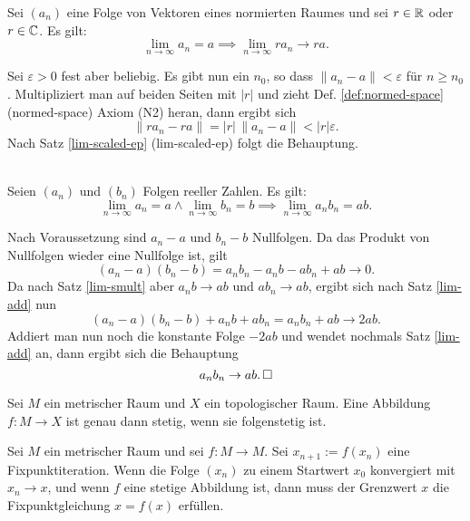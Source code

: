\begin{Satz}\label{lim-smult}
Sei $(a_n)$ eine Folge von Vektoren eines normierten Raumes
und sei $r\in\mathbb R$ oder $r\in\mathbb C$. Es gilt:
\[\lim_{n\to\infty} a_n = a\implies \lim_{n\to\infty} ra_n\to ra.\]
\end{Satz}

\begin{Beweis}
Sei $\varepsilon>0$ fest aber beliebig. Es gibt nun ein $n_0$, so
dass $\|a_n-a\|<\varepsilon$ für $n\ge n_0$.
Multipliziert man auf beiden Seiten
mit $|r|$ und zieht Def. \ref{def:normed-space} (normed-space)
Axiom (N2) heran, dann ergibt sich
\[\|ra_n-ra\| = |r|\,\|a_n-a\|<|r|\varepsilon.\]
Nach Satz \ref{lim-scaled-ep} (lim-scaled-ep)
folgt die Behauptung.\,\qedsymbol
\end{Beweis}

\begin{Satz}\mbox{}\\
Seien $(a_n)$ und $(b_n)$ Folgen
reeller Zahlen. Es gilt:
\[\lim_{n\to\infty} a_n=a\land\lim_{n\to\infty} b_n=b\implies
\lim_{n\to\infty} a_n b_n = ab.\]
\end{Satz}

\begin{Beweis}
Nach Voraussetzung sind $a_n-a$ und $b_n-b$ Nullfolgen.
Da das Produkt von Nullfolgen wieder eine Nullfolge ist, gilt
\[(a_n-a)(b_n-b) = a_n b_n-a_n b-ab_n+ab\to 0.\]
Da nach Satz \ref{lim-smult} aber $a_n b\to ab$ und $ab_n\to ab$,
ergibt sich nach Satz \ref{lim-add} nun
\[(a_n-a)(b_n-b)+a_n b+ab_n = a_n b_n+ab\to 2ab.\]
Addiert man nun noch die konstante Folge $-2ab$
und wendet nochmals Satz \ref{lim-add} an, dann ergibt sich
die Behauptung
\[a_n b_n\to ab.\,\square\]
\end{Beweis}

\newpage
\begin{Satz}\label{cont-seqcont}%
Sei $M$ ein metrischer Raum und $X$ ein topologischer Raum.
Eine Abbildung $f\colon M\to X$ ist genau dann stetig, wenn
sie folgenstetig ist.
\end{Satz}

\begin{Satz}
Sei $M$ ein metrischer Raum und sei $f\colon M\to M$.
Sei $x_{n+1}:=f(x_n)$ eine Fixpunktiteration. Wenn die Folge
$(x_n)$ zu einem Startwert $x_0$ konvergiert mit $x_n\to x$, und
wenn $f$ eine stetige Abbildung ist, dann muss der Grenzwert $x$ die
Fixpunktgleichung $x=f(x)$ erfüllen.
\end{Satz}

